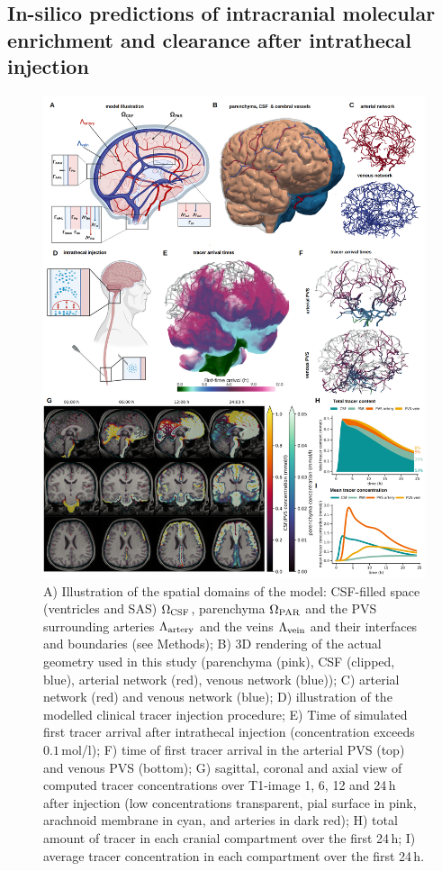 \documentclass[fleqn,10pt]{wlscirep}
\begin{document}
\subsection*{In-silico predictions of intracranial molecular enrichment and clearance after intrathecal injection}
\begin{figure}
    \centering
    \includegraphics[width=0.95 \textwidth]{figures/figure1.png}
     \caption{A) Illustration of the spatial domains of the model: CSF-filled space (ventricles and SAS) $\Omega_{\rm CSF}$, parenchyma $\Omega_{\rm PAR}$ and the PVS surrounding arteries $\Lambda_{\rm artery}$ and the veins $\Lambda_{\rm vein}$ and their interfaces and boundaries (see Methods); B) 3D rendering of the actual geometry used in this study (parenchyma (pink), CSF (clipped, blue), arterial network (red), venous network (blue)); C) arterial network (red) and venous network (blue); D) illustration of the modelled clinical tracer injection procedure; E) Time of simulated first tracer arrival after intrathecal injection (concentration exceeds $0.1\,$mol/l); F) time of first tracer arrival in the arterial PVS (top) and venous PVS (bottom); G) sagittal, coronal and axial view of computed tracer concentrations over T1-image 1, 6, 12 and 24\,h after injection (low concentrations transparent, pial surface in pink, arachnoid membrane in cyan, and arteries in dark red); H) total amount of tracer in each cranial compartment over the first 24\,h; I) average tracer concentration in each compartment over the first 24\,h. }
     \label{fig:results1}
\end{figure}
\end{document}
